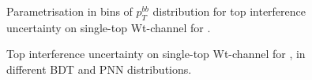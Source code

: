 \begin{figure}
  \centering
  \caption{Parametrisation in bins of $p_T^{bb}$ distribution for top interference uncertainty on single-top Wt-channel for \hadhad.}
  \label{fig:singletopsyst_hadhad_interference_pTBB}
\end{figure}

\begin{figure}
  \centering
  \caption{Top interference uncertainty on single-top Wt-channel for \hadhad, in different BDT and PNN distributions.}
  \label{fig:singletopsyst_hadhad_interference_MVA}
\end{figure}

